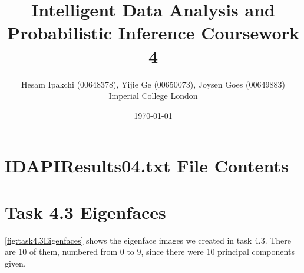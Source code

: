 \documentclass[12pt]{article}
\begin{document}
\nocite{*}


\title{\textbf{Intelligent Data Analysis and Probabilistic Inference Coursework 4}}
\author{Hesam Ipakchi (00648378), Yijie Ge (00650073), Joysen Goes (00649883)\\Imperial College London}
\date{\today}
\clearpage\maketitle
\thispagestyle{empty}


\newpage
\thispagestyle{plain}
\mbox{}


\section {IDAPIResults04.txt File Contents}
\label{sec:resultsFileContents}




\newpage
\thispagestyle{plain}
\mbox{}

\section {Task 4.3 Eigenfaces}
\label{sec:task4.3Eigenfaces}

\cref{fig:task4.3Eigenfaces} shows the eigenface images we created in task 4.3. There are 10 of them, numbered from 0 to 9, since there were 10 principal components given.
\end{document}
